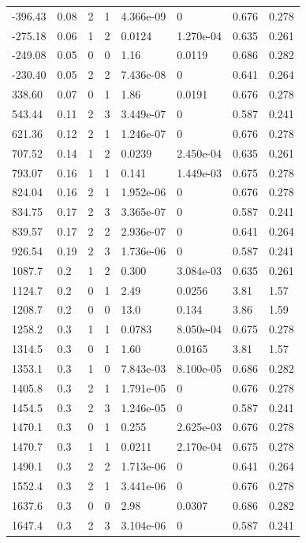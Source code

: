 \documentclass[preview]{standalone}
\begin{document}
{{\begin{tabular}{L{1.2cm}C{1.2cm} C{0.3cm}C{0.5cm} C{1.4cm}C{1.4cm} C{1.4cm}C{1.4cm}}
  -396.43  &  0.08  & 2     &  1 &  4.366e-09  & 0  & 0.676 &  0.278   \\ 
  -275.18  &  0.06  & 1     &  2 &  0.0124  & 1.270e-04  & 0.635 &  0.261   \\ 
  -249.08  &  0.05  & 0     &  0 &  1.16  & 0.0119  & 0.686 &  0.282   \\ 
  -230.40  &  0.05  & 2     &  2 &  7.436e-08  & 0  & 0.641 &  0.264   \\ 
  338.60  &  0.07  & 0     &  1 &  1.86  & 0.0191  & 0.676 &  0.278   \\ 
  543.44  &  0.11  & 2     &  3 &  3.449e-07  & 0  & 0.587 &  0.241   \\ 
  621.36  &  0.12  & 2     &  1 &  1.246e-07  & 0  & 0.676 &  0.278   \\ 
  707.52  &  0.14  & 1     &  2 &  0.0239  & 2.450e-04  & 0.635 &  0.261   \\ 
  793.07  &  0.16  & 1     &  1 &  0.141  & 1.449e-03  & 0.675 &  0.278   \\ 
  824.04  &  0.16  & 2     &  1 &  1.952e-06  & 0  & 0.676 &  0.278   \\ 
  834.75  &  0.17  & 2     &  3 &  3.365e-07  & 0  & 0.587 &  0.241   \\ 
  839.57  &  0.17  & 2     &  2 &  2.936e-07  & 0  & 0.641 &  0.264   \\ 
  926.54  &  0.19  & 2     &  3 &  1.736e-06  & 0  & 0.587 &  0.241   \\ 
  1087.7  &   0.2  & 1     &  2 &  0.300  & 3.084e-03  & 0.635 &  0.261   \\ 
  1124.7  &   0.2  & 0     &  1 &  2.49  & 0.0256  & 3.81 &  1.57   \\ 
  1208.7  &   0.2  & 0     &  0 &  13.0  & 0.134  & 3.86 &  1.59   \\ 
  1258.2  &   0.3  & 1     &  1 &  0.0783  & 8.050e-04  & 0.675 &  0.278   \\ 
  1314.5  &   0.3  & 0     &  1 &  1.60  & 0.0165  & 3.81 &  1.57   \\ 
  1353.1  &   0.3  & 1     &  0 &  7.843e-03  & 8.100e-05  & 0.686 &  0.282   \\ 
  1405.8  &   0.3  & 2     &  1 &  1.791e-05  & 0  & 0.676 &  0.278   \\ 
  1454.5  &   0.3  & 2     &  3 &  1.246e-05  & 0  & 0.587 &  0.241   \\ 
  1470.1  &   0.3  & 0     &  1 &  0.255  & 2.625e-03  & 0.676 &  0.278   \\ 
  1470.7  &   0.3  & 1     &  1 &  0.0211  & 2.170e-04  & 0.675 &  0.278   \\ 
  1490.1  &   0.3  & 2     &  2 &  1.713e-06  & 0  & 0.641 &  0.264   \\ 
  1552.4  &   0.3  & 2     &  1 &  3.441e-06  & 0  & 0.676 &  0.278   \\ 
  1637.6  &   0.3  & 0     &  0 &  2.98  & 0.0307  & 0.686 &  0.282   \\ 
  1647.4  &   0.3  & 2     &  3 &  3.104e-06  & 0  & 0.587 &  0.241   \\ 
\hline 
\end{tabular} 

}}
\end{document}
